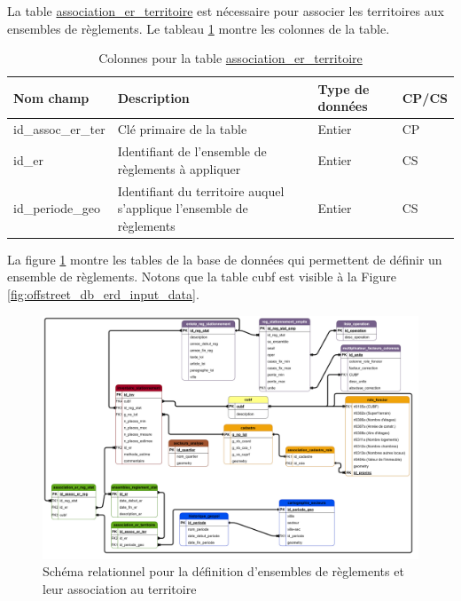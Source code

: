         La table \underline{association\_er\_territoire} est nécessaire pour associer les territoires aux ensembles de règlements. Le tableau \ref{tab:definition_association_er_territoire} montre les colonnes de la table.
        \begin{table}[h]
           \centering
           \begin{tabular}{m{}|m{}m{}m{}}
                \hline
                Nom champ & Description & Type de données & CP/CS  \\
                \hline
                id\_assoc\_er\_ter & Clé primaire de la table & Entier & CP \\  
                id\_er & Identifiant de l'ensemble de règlements à appliquer & Entier & CS \\
                id\_periode\_geo & Identifiant du territoire auquel s'applique l'ensemble de règlements & Entier & CS\\
                \hline
           \end{tabular}
           \caption{Colonnes pour la table \underline{association\_er\_territoire}}
           \label{tab:definition_association_er_territoire}
        \end{table}   
        La figure \ref{fig:offstreet_db_erd_rulesets} montre les tables de la base de données qui permettent de définir un ensemble de règlements. Notons que la table cubf est visible à la Figure \ref{fig:offstreet_db_erd_input_data}.
        \begin{figure}[h]
            \centering
            \includegraphics[trim={0 0 155cm 105cm},clip,width=15cm]{dia/ERD_stationnement_propre.png}
            \caption{Schéma relationnel pour la définition d'ensembles de règlements et leur association au territoire}
            \label{fig:offstreet_db_erd_rulesets}
        \end{figure}
        \FloatBarrier
